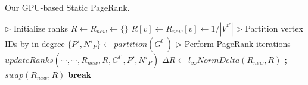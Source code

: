 \begin{algorithm}[!hbt]
\caption{Our GPU-based Static PageRank.}
\label{alg:static}
\begin{algorithmic}[1]

\Statex

  \State $\rhd$ Initialize ranks
  \State $R \gets R_{new} \gets \{\}$ \label{alg:static--initialize-begin}
    \State $R[v] \gets R_{new}[v] \gets 1/|V^{t'}|$
  \EndFor \label{alg:static--initialize-end}
  \State $\rhd$ Partition vertex IDs by in-degree 
  \State $\{P', N'_P\} \gets partition(G^{t'})$ \label{alg:static--partition} 
  \State $\rhd$ Perform PageRank iterations
  \ForAll{$i \in [0 .. MAX\_ITERATIONS)$} \label{alg:static--compute-begin}
    \State $updateRanks(\cdots, \cdots, R_{new}, R, G^{t'}, P', N'_P)$  \label{alg:static--update}
    \State $\Delta R \gets l_{\infty}NormDelta(R_{new}, R)$ \textbf{;} $swap(R_{new}, R)$ \label{alg:static--error}
     \textbf{break} \label{alg:static--converged}
    \EndIf
  \EndFor \label{alg:static--compute-end}
  \State {} \label{alg:static--return}
\EndFunction
\end{algorithmic}
\end{algorithm}
